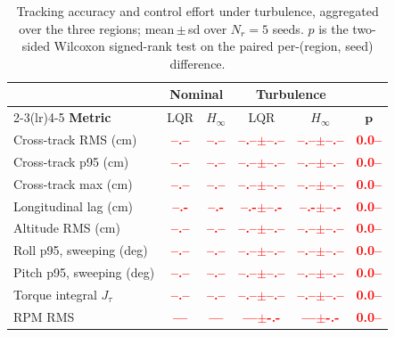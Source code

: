\documentclass[10pt,letterpaper]{article}
\newcommand{\val}[1]{\textcolor{red}{\textbf{#1}}}
\begin{document}
\begin{table}[tbp]
    \centering
    \caption{Tracking accuracy and control effort under turbulence, aggregated over the three regions;
        mean\,$\pm$\,sd over $N_r=5$ seeds. $p$ is the two-sided Wilcoxon signed-rank test
        on the paired per-(region, seed) difference.}
    \label{tab:r2}
    \begin{tabular}{lccccc}
        \toprule
                                  & \multicolumn{2}{c}{\textbf{Nominal}} & \multicolumn{2}{c}{\textbf{Turbulence}} &                                                                  \\
        \cmidrule(lr){2-3}\cmidrule(lr){4-5}
        \textbf{Metric}           & LQR                                  & $H_\infty$                              & LQR                   & $H_\infty$            & $\boldsymbol{p}$ \\
        \midrule
        Cross-track RMS (cm)      & \val{--.--}                          & \val{--.--}                             & \val{--.--$\pm$--.--} & \val{--.--$\pm$--.--} & \val{0.0--}      \\
        Cross-track p95 (cm)      & \val{--.--}                          & \val{--.--}                             & \val{--.--$\pm$--.--} & \val{--.--$\pm$--.--} & \val{0.0--}      \\
        Cross-track max (cm)      & \val{--.--}                          & \val{--.--}                             & \val{--.--$\pm$--.--} & \val{--.--$\pm$--.--} & \val{0.0--}      \\
        Longitudinal lag (cm)     & \val{--.-}                           & \val{--.-}                              & \val{--.-$\pm$--.-}   & \val{--.-$\pm$--.-}   & \val{0.0--}      \\
        Altitude RMS (cm)         & \val{--.--}                          & \val{--.--}                             & \val{--.--$\pm$--.--} & \val{--.--$\pm$--.--} & \val{0.0--}      \\
        Roll p95, sweeping (deg)  & \val{--.--}                          & \val{--.--}                             & \val{--.--$\pm$--.--} & \val{--.--$\pm$--.--} & \val{0.0--}      \\
        Pitch p95, sweeping (deg) & \val{--.--}                          & \val{--.--}                             & \val{--.--$\pm$--.--} & \val{--.--$\pm$--.--} & \val{0.0--}      \\
        \addlinespace
        Torque integral $J_\tau$  & \val{--.--}                          & \val{--.--}                             & \val{--.--$\pm$--.--} & \val{--.--$\pm$--.--} & \val{0.0--}      \\
        RPM RMS                   & \val{---}                            & \val{---}                               & \val{---$\pm$-.-}     & \val{---$\pm$-.-}     & \val{0.0--}      \\
        \bottomrule
    \end{tabular}
\end{table}
\end{document}
